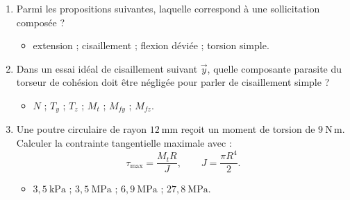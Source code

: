 \begin{enumerate}
  \item Parmi les propositions suivantes, laquelle correspond à une sollicitation composée ?
  \begin{itemize}
    \item extension ; cisaillement ; flexion déviée ; torsion simple.
  \end{itemize}

  \item Dans un essai idéal de cisaillement suivant $\vec y$, quelle composante parasite du torseur de cohésion doit être négligée pour parler de cisaillement simple ?
  \begin{itemize}
    \item $N$ ; $T_y$ ; $T_z$ ; $M_t$ ; $M_{fy}$ ; $M_{fz}$.
  \end{itemize}

  \item Une poutre circulaire de rayon $12\ \mathrm{mm}$ reçoit un moment de torsion de $9\ \mathrm{N\,m}$. Calculer la contrainte tangentielle maximale avec :
  \[
  \tau_{\max}=\frac{M_tR}{J},
  \qquad
  J=\frac{\pi R^4}{2}.
  \]
  \begin{itemize}
    \item $3{,}5\ \mathrm{kPa}$ ; $3{,}5\ \mathrm{MPa}$ ; $6{,}9\ \mathrm{MPa}$ ; $27{,}8\ \mathrm{MPa}$.
  \end{itemize}
\end{enumerate}
